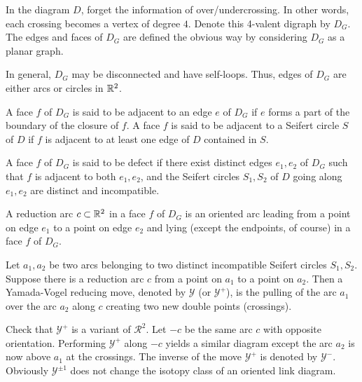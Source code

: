 In the diagram $D$, forget the information of over/undercrossing. In other words, each crossing becomes a vertex of degree $4$. Denote this 4-valent digraph by $D_G$. The edges and faces of $D_G$ are defined the obvious way by considering $D_G$ as a planar graph.

\begin{remark}
\label{sec:artin-braid-group-11}
In general, $D_G$ may be disconnected and have self-loops. Thus, edges of $D_G$ are either arcs or circles in $\mathbb{R}^2$.
\end{remark}

\begin{definition}
\label{sec:artin-braid-group-12}
A face $f$ of $D_G$ is said to be adjacent to an edge $e$ of $D_G$ if $e$ forms a part of the boundary of the closure of $f$. A face $f$ is said to be adjacent to a Seifert circle $S$ of $D$ if $f$ is adjacent to at least one edge of $D$ contained in $S$.
\end{definition}

\begin{definition}
\label{sec:artin-braid-group-13}
A face $f$ of $D_G$ is said to be defect if there exist distinct edges $e_1, e_2$ of $D_G$ such that $f$ is adjacent to both $e_1, e_2$, and the Seifert circles $S_1, S_2$ of $D$ going along $e_1, e_2$ are distinct and incompatible.
\end{definition}

\begin{definition}
\label{sec:artin-braid-group-14}
A reduction arc $c \subset \mathbb{R}^2$ in a face $f$ of $D_G$ is an oriented arc leading from a point on edge $e_1$ to a point on edge $e_2$ and lying (except the endpoints, of course) in a face $f$ of $D_G$.
\end{definition}

\begin{definition}
\label{sec:artin-braid-group-15}
Let $a_1, a_2$ be two arcs belonging to two distinct incompatible Seifert circles $S_1, S_2$. Suppose there is a reduction arc $c$ from a point on $a_1$ to a point on $a_2$. Then a Yamada-Vogel reducing move, denoted by $\mathcal{Y}$ (or $\mathcal{Y}^+$), is the pulling of the arc $a_1$ over the arc $a_2$ along $c$ creating two new double points (crossings).
\end{definition}

\begin{remark}
\label{sec:artin-braid-group-16}
Check that $\mathcal{Y}^+$ is a variant of $\mathcal{R}^2$. Let $-c$ be the same arc $c$ with opposite orientation. Performing $\mathcal{Y}^+$ along $-c$ yields a similar diagram except the arc $a_2$ is now above $a_1$ at the crossings. The inverse of the move $\mathcal{Y}^+$ is denoted by $\mathcal{Y}^-$.  Obviously $\mathcal{Y}^{\pm 1}$ does not change the isotopy class of an oriented link diagram.
\end{remark}

